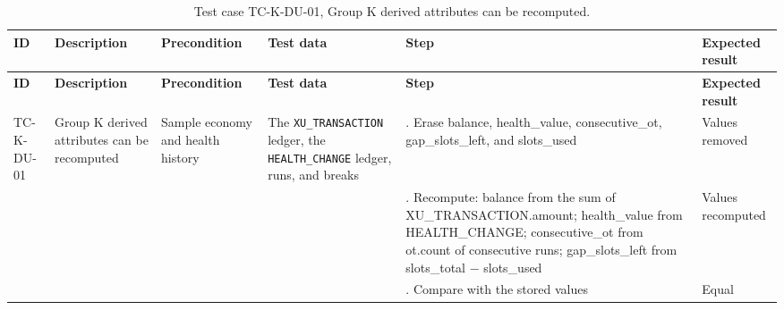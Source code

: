 {\footnotesize{}\renewcommand{\arraystretch}{1.1}
\begin{longtable}{|>{\raggedright\arraybackslash}p{}|>{\raggedright\arraybackslash}p{}|>{\raggedright\arraybackslash}p{}|>{\raggedright\arraybackslash}p{}|>{\raggedright\arraybackslash}p{}|>{\raggedright\arraybackslash}p{}|}
\caption{Test case TC-K-DU-01, Group K derived attributes can be recomputed.} \\
\hline
\textbf{ID} & \textbf{Description} & \textbf{Precondition} & \textbf{Test data} & \textbf{Step} & \textbf{Expected result} \\ \hline
\endfirsthead
\hline
\textbf{ID} & \textbf{Description} & \textbf{Precondition} & \textbf{Test data} & \textbf{Step} & \textbf{Expected result} \\ \hline
\endhead
TC-K-DU-01 & Group K derived attributes can be recomputed & Sample economy and health history & The \texttt{XU\_\allowbreak{}TRANSACTION} ledger, the \texttt{HEALTH\_\allowbreak{}CHANGE} ledger, runs, and breaks & 1. Erase balance, health\_\allowbreak{}value, consecutive\_\allowbreak{}ot, gap\_\allowbreak{}slots\_\allowbreak{}left, and slots\_used & Values removed \\ \cline{5-6}
 &  &  &  & 2. Recompute: balance from the sum of XU\_\allowbreak{}TRANSACTION.\allowbreak{}amount; health\_\allowbreak{}value from HEALTH\_\allowbreak{}CHANGE; consecutive\_\allowbreak{}ot from ot.count of consecutive runs; gap\_\allowbreak{}slots\_\allowbreak{}left from slots\_total $-$ slots\_used & Values recomputed \\ \cline{5-6}
 &  &  &  & 3. Compare with the stored values & Equal \\ \hline
\end{longtable}
}


